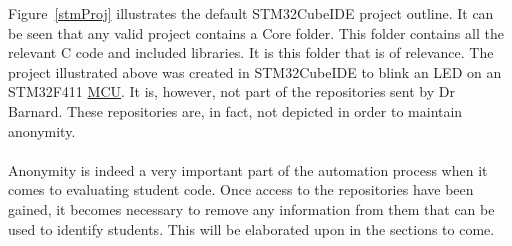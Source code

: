Figure~\ref{stmProj} illustrates the default STM32CubeIDE project outline. It can be seen that any valid project contains a Core folder. This folder contains all the relevant C code and included libraries. It is this folder that is of relevance. The project illustrated above was created in STM32CubeIDE to blink an LED on an STM32F411 \hyperref[listAbr]{MCU}. It is, however, not part of the repositories sent by Dr Barnard. These repositories are, in fact, not depicted in order to maintain anonymity. 
\\\\
Anonymity is indeed a very important part of the automation process when it comes to evaluating student code. Once access to the repositories have been gained, it becomes necessary to remove any information from them that can be used to identify students. This will be elaborated upon in the sections to come.